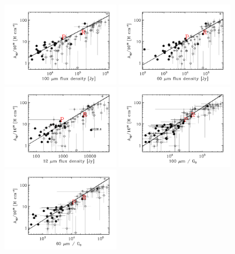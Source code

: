 \begin{figure}[tb]
\begin{center}
\includegraphics[width=0.45\textwidth]{EPS/fig18_1.pdf}
\includegraphics[width=0.45\textwidth]{EPS/fig18_2.pdf}
\includegraphics[width=0.45\textwidth]{EPS/fig18_3.pdf}
\includegraphics[width=0.45\textwidth]{EPS/fig18_4.pdf}
\includegraphics[width=0.45\textwidth]{EPS/fig18_5.pdf}

\end{center}
\end{figure}
